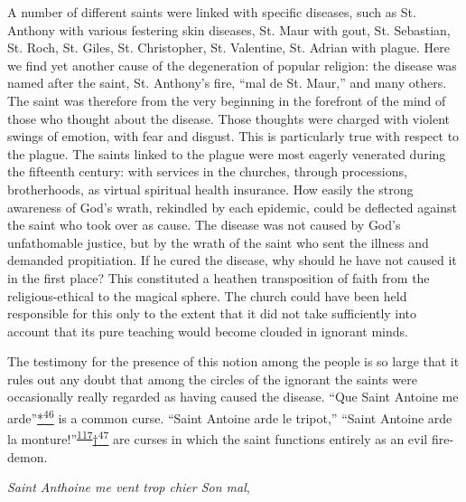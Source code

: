 A number of different saints were linked with specific diseases, such as
St. Anthony with various festering skin diseases, St. Maur with gout,
St. Sebastian, St. Roch, St. Giles, St. Christopher, St. Valentine, St.
Adrian with plague. Here we find yet another cause of the degeneration
of popular religion: the disease was named after the saint, St.
Anthony's fire, ``mal de St. Maur,'' and many others. The saint was
therefore from the very beginning in the forefront of the mind of those
who thought about the disease. Those
\protect\hypertarget{13_Chapter_Six__THE_DEPICTION_OF_TH.xhtmlux5cux23page_199}{}{}thoughts
were charged with violent swings of emotion, with fear and disgust. This
is particularly true with respect to the plague. The saints linked to
the plague were most eagerly venerated during the fifteenth century:
with services in the churches, through processions, brotherhoods, as
virtual spiritual health insurance. How easily the strong awareness of
God's wrath, rekindled by each epidemic, could be deflected against the
saint who took over as cause. The disease was not caused by God's
unfathomable justice, but by the wrath of the saint who sent the illness
and demanded propitiation. If he cured the disease, why should he have
not caused it in the first place? This constituted a heathen
transposition of faith from the religious-ethical to the magical sphere.
The church could have been held responsible for this only to the extent
that it did not take sufficiently into account that its pure teaching
would become clouded in ignorant minds.

The testimony for the presence of this notion among the people is so
large that it rules out any doubt that among the circles of the ignorant
the saints were occasionally really regarded as having caused the
disease. ``Que Saint Antoine me
arde''\protect\hypertarget{13_Chapter_Six__THE_DEPICTION_OF_TH.xhtmlux5cux23id_3067}{\protect\hyperlink{23_NOTES.xhtmlux5cux23id_3068}{*\textsuperscript{46}}}
is a common curse. ``Saint Antoine arde le tripot,'' ``Saint Antoine
arde la
monture!''\textsuperscript{\protect\hypertarget{13_Chapter_Six__THE_DEPICTION_OF_TH.xhtmlux5cux23id_1039}{\protect\hyperlink{23_NOTES.xhtmlux5cux23id_1040}{117}}}\protect\hypertarget{13_Chapter_Six__THE_DEPICTION_OF_TH.xhtmlux5cux23id_3069}{\protect\hyperlink{23_NOTES.xhtmlux5cux23id_3070}{†\textsuperscript{47}}}
are curses in which the saint functions entirely as an evil fire-demon.

\emph{Saint Anthoine me vent trop chier Son mal},


